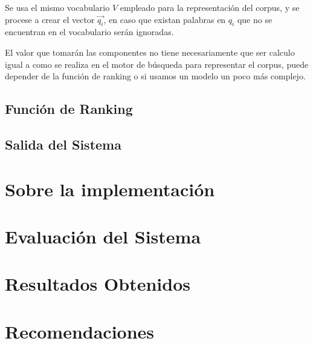 \documentclass[runningheads,a4paper]{llncs}
\begin{document}
Se usa el mismo vocabulario $V$ empleado para la representación del corpus, y se procese a crear el vector $\overrightarrow{q_i}$, en caso que existan palabras en $q_i$ que no se encuentran en el vocabulario serán ignoradas. 

El valor que tomarán las componentes no tiene necesariamente que ser calculo igual a como se realiza en el motor de búsqueda para representar el corpus, puede depender de la función de ranking o si usamos un modelo un poco más complejo.

\subsection*{Función de Ranking} 

\subsection*{Salida del Sistema}

\section{Sobre la implementación} %

\section{Evaluación del Sistema}

\section{Resultados Obtenidos}

\section{Recomendaciones}
\end{document}
